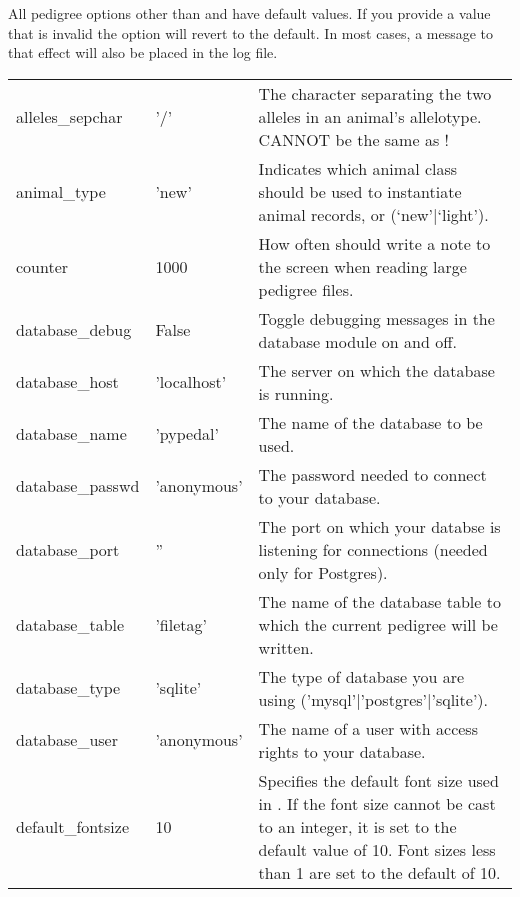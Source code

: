 All pedigree options other than  and  have default values.  If you provide a value that is invalid the option will revert to the default.  In most cases, a message to that effect will also be placed in the log file.
\begin{center}
    \tablelasttail{\hline}
    \label{tbl:options}
    \begin{xtabular}{l|l|p{4in}}
	alleles\_sepchar  & '/'          & The character separating the two alleles in an animal's allelotype.  CANNOT be the same as ! \\
	animal\_type  & 'new'            & Indicates which animal class should be used to instantiate animal records,  or  (`new'|`light'). \\
	counter          & 1000          & How often should \PyPedal{} write a note to the screen when reading large pedigree files. \\
	database\_debug  & False         & Toggle debugging messages in the database module on and off. \\
	database\_host   & 'localhost'   & The server on which the database is running. \\
	database\_name   & 'pypedal'     & The name of the database to be used. \\
	database\_passwd & 'anonymous'   & The password needed to connect to your database. \\
	database\_port   & ''            & The port on which your databse is listening for connections (needed only for Postgres). \\
	database\_table  & 'filetag'     & The name of the database table to which the current pedigree will be written. \\
	database\_type   & 'sqlite'      & The type of database you are using ('mysql'|'postgres'|'sqlite'). \\
	database\_user   & 'anonymous'   & The name of a user with access rights to your database.  \\
	default\_fontsize & 10           & Specifies the default font size used in . If the font size cannot be cast to an integer, it is set to the default value of 10. Font sizes less than 1 are set to the default of 10. \\

\end{xtabular}
\end{center}
